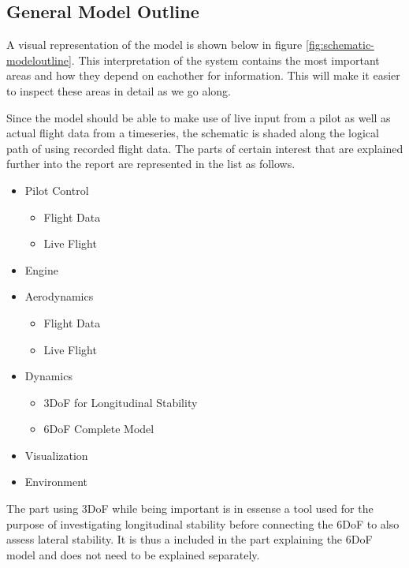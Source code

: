 \subsection{General Model Outline}

A visual representation of the model is shown below in figure \ref{fig:schematic-modeloutline}. This interpretation of the system contains the most important areas and how they depend on eachother for information. This will make it easier to inspect these areas in detail as we go along.


Since the model should be able to make use of live input from a pilot as well as actual flight data from a timeseries, the schematic is shaded along the logical path of using recorded flight data. The parts of certain interest that are explained further into the report are represented in the list as follows.

\begin{itemize}
  \item Pilot Control
    \begin{itemize}
      \item Flight Data
      \item Live Flight
    \end{itemize}
  \item Engine
  \item Aerodynamics
  \begin{itemize}
    \item Flight Data
    \item Live Flight
  \end{itemize}
  \item Dynamics
  \begin{itemize}
    \item 3DoF for Longitudinal Stability
    \item 6DoF Complete Model
  \end{itemize}
  \item Visualization
  \item Environment
\end{itemize}

The part using 3DoF while being important is in essense a tool used for the purpose of investigating longitudinal stability before connecting the 6DoF to also assess lateral stability. It is thus a included in the part explaining the 6DoF model and does not need to be explained separately. 
